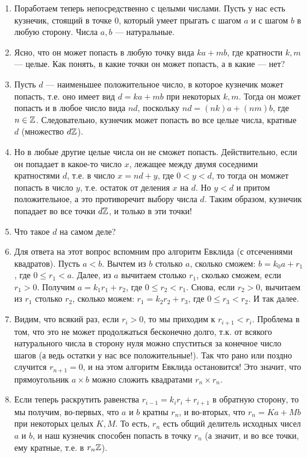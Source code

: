 \begin{enumerate}\setlength{\itemsep}{1pt}
\item Поработаем теперь непосредственно с целыми числами. Пусть у нас есть кузнечик, стоящий в точке 0, который умеет прыгать с шагом $a$ и с шагом $b$ в любую сторону. Числа $a,b$ --- натуральные.
\item Ясно, что он может попасть в любую точку вида $ka+mb$, где кратности $k,m$ --- целые. Как понять, в какие точки он может попасть, а в какие --- нет?
\item Пусть $d$ --- наименьшее положительное число, в которое кузнечик может попасть, т.е. оно имеет вид $d=ka+mb$ при некоторых $k,m$. Тогда он может попасть и в любое число вида $nd$, поскольку $nd=(nk)a+(nm)b$, где $n\in\mathbb Z$. Следовательно, кузнечик может попасть во все целые числа, кратные $d$ (множество $d\mathbb Z$).
\item Но в любые другие целые числа он не сможет попасть. Действительно, если он попадает в какое-то число $x$, лежащее между двумя соседними кратностями $d$, т.е. в число $x=nd+y$, где $0<y<d$, то тогда он момжет попасть в число $y$, т.е. остаток от деления $x$ на $d$. Но $y<d$ и притом положительное, а это противоречит выбору числа $d$. Таким образом, кузнечик попадает во все точки $d\mathbb Z$, и только в эти точки!
\item Что такое $d$ на самом деле?
\item Для ответа на этот вопрос вспомним про алгоритм Евклида (с отсечениями квадратов). Пусть $a<b$. Вычтем из $b$ столько $a$, сколько сможем: $b=k_0a+r_1$, где $0\le r_1<a$. Далее, из $a$ вычитаем столько $r_1$, сколько сможем, если $r_1>0$. Получим $a=k_1r_1+r_2$, где $0\le r_2<r_1$. Снова, если $r_2>0$, вычитаем из $r_1$ столько $r_2$, сколько можем: $r_1=k_2r_2+r_3$, где $0\le r_3<r_2$. И так далее.
\item Видим, что всякий раз, если $r_i>0$, то мы приходим к $r_{i+1}<r_i$. Проблема в том, что это не может продолжаться бесконечно долго, т.к. от всякого натурального числа в сторону нуля можно спуститься за конечное число шагов (а ведь остатки у нас все положительные!). Так что рано или поздно случится $r_{n+1}=0$, и на этом алгоритм Евклида остановится! Это значит, что прямоугольник $a\times b$ можно сложить квадратами $r_n\times r_n$.
\item Если теперь раскрутить равенства $r_{i-1}=k_ir_i+r_{i+1}$ в обратную сторону, то мы получим, во-первых, что $a$ и $b$ кратны $r_n$, и во-вторых, что $r_n=Ka+Mb$ при некоторых целых $K,M$. То есть, $r_n$ есть общий делитель исходных чисел $a$ и $b$, и наш кузнечик способен попасть в точку $r_n$ (а значит, и во все точки, ему кратные, т.е. в $r_n\mathbb Z$).

\end{enumerate}
